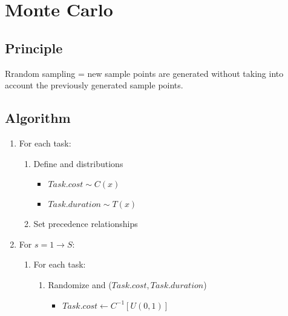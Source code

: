 \documentclass[letterpaper,10pt,english]{jupyterBook}
\begin{document}
\section{Monte Carlo}
\label{\detokenize{PM/jcsrua:monte-carlo}}

\subsection{Principle}
\label{\detokenize{PM/jcsrua:principle}}
\sphinxAtStartPar
Rrandom sampling = new sample points are generated without taking into account the previously generated sample points.


\subsection{Algorithm}
\label{\detokenize{PM/jcsrua:id5}}\begin{enumerate}
%
\item {} 
\sphinxAtStartPar
For each task:
\begin{enumerate}
%
\item {} 
\sphinxAtStartPar
Define  and  distributions
\begin{itemize}
\item {} 
\sphinxAtStartPar
\(Task.cost \sim C(x)\)

\item {} 
\sphinxAtStartPar
\(Task.duration \sim T(x)\)

\end{itemize}

\item {} 
\sphinxAtStartPar
Set precedence relationships

\end{enumerate}

\item {} 
\sphinxAtStartPar
For \( s=1 \rightarrow S\):
\begin{enumerate}
%
\item {} 
\sphinxAtStartPar
For each task:
\begin{enumerate}
%
\item {} 
\sphinxAtStartPar
Randomize  and  (\(Task.cost, Task.duration\))
\begin{itemize}
\item {} 
\sphinxAtStartPar
\(Task.cost \leftarrow C^{-1}[U(0,1)]\)


\end{itemize}
\end{enumerate}
\end{enumerate}
\end{enumerate}
\end{document}
